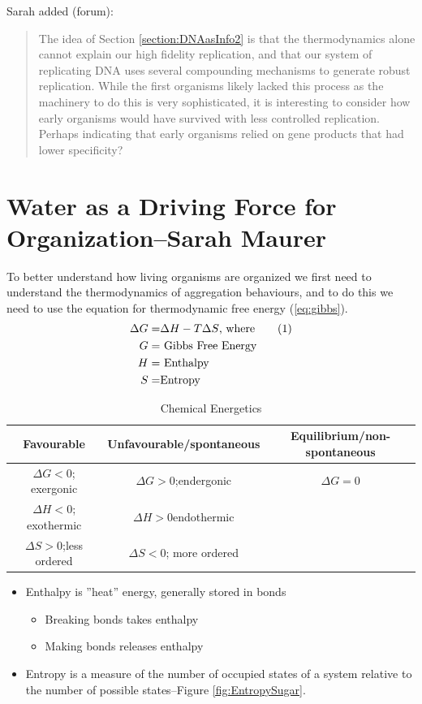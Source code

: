 \documentclass[]{article}
\newcommand\numberthis{\addtocounter{equation}{1}\tag{\theequation}}
\begin{document}
Sarah added (forum):
\begin{quote}
	The idea of Section \ref{section:DNAasInfo2} is that the thermodynamics alone cannot explain our high fidelity replication, and that our system of replicating DNA uses several compounding mechanisms to generate robust replication. While the first organisms likely lacked this process as the machinery to do this is very sophisticated, it is interesting to consider how early organisms would have survived with less controlled replication. Perhaps indicating that early organisms relied on gene products that had lower specificity?
\end{quote}

\section[Water as a Driving Force for Organization]{Water as a Driving Force for Organization--Sarah Maurer
}

To better understand how living organisms are organized we first need to understand the thermodynamics of aggregation behaviours, and to do this we need to use the equation for thermodynamic free energy (\ref{eq:gibbs}).
\begin{align*}
	\Delta G =& \Delta H - T \Delta S \text{, where}\numberthis \label{eq:gibbs}\\
	G =& \text{ Gibbs Free Energy}\\
	H =& \text{ Enthalpy}\\
	S =& \text{Entropy}
\end{align*}

\begin{table}[H]
	\begin{center}
		\caption{Chemical Energetics}\label{tab:chemical:energetics}
		\begin{tabular}[pos]{|c|c|c|}\hline
			Favourable&Unfavourable/spontaneous&Equilibrium/non-spontaneous\\\hline
			$\Delta G<0$; exergonic&$\Delta G>0$;endergonic&$\Delta G=0$\\\hline
			$\Delta H<0$; exothermic&$\Delta H>0$endothermic&\\\hline
			$\Delta S>0$;less ordered&$\Delta S<0$; more ordered&\\\hline
		\end{tabular}
	\end{center}
\end{table}


\begin{itemize}
	\item  Enthalpy is ”heat” energy, generally stored in bonds
	\begin{itemize}
		\item Breaking bonds takes enthalpy
		\item Making bonds releases enthalpy
	\end{itemize}
	\item Entropy is a measure of the number of occupied states of a system relative to the number of possible	states--Figure \ref{fig:EntropySugar}.
\end{itemize}
\end{document}
